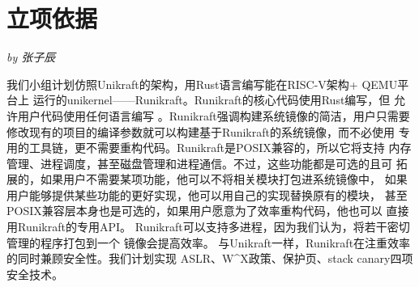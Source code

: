 \documentclass[UTF8,fontset=none,linespread=1.15]{ctexart}
\newcommand{\sectionauthor}[1]{%
\vspace*{-5ex}
\noindent\textrm{\hfill\textit{by #1}}
\vspace*{2ex}\par}
\begin{document}
%
%

\section{立项依据}\sectionauthor{张子辰}
我们小组计划仿照Unikraft的架构，用Rust语言编写能在RISC-V架构+ QEMU平台上
运行的unikernel——Runikraft。Runikraft的核心代码使用Rust编写，但
允许用户代码使用任何语言编写
。Runikraft强调构建系统镜像的简洁，用户只需要
修改现有的项目的编译参数就可以构建基于Runikraft的系统镜像，而不必使用
专用的工具链，更不需要重构代码。Runikraft是POSIX兼容的，所以它将支持
内存管理、进程调度，甚至磁盘管理和进程通信。不过，这些功能都是可选的且可
拓展的，如果用户不需要某项功能，他可以不将相关模块打包进系统镜像中，
如果用户能够提供某些功能的更好实现，他可以用自己的实现替换原有的模块，
甚至POSIX兼容层本身也是可选的，如果用户愿意为了效率重构代码，他也可以
直接用Runikraft的专用API。
Runikraft可以支持多进程，因为我们认为，将若干密切管理的程序打包到一个
镜像会提高效率。
与Unikraft一样，Runikraft在注重效率的同时兼顾安全性。我们计划实现
ASLR、W\^{}X政策、保护页、stack canary四项安全技术。
\end{document}
